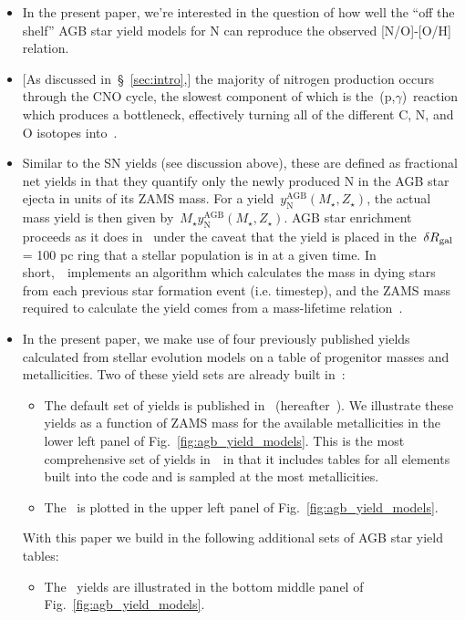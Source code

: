 \documentclass[ms.tex]{subfiles}
\begin{document}
\begin{itemize} 
	\item In the present paper, we're interested in the question of how 
	well the ``off the shelf'' AGB star yield models for N can reproduce the 
	observed [N/O]-[O/H] relation. 

	\item {[As discussed in~\S~\ref{sec:intro},]} the majority of nitrogen 
	production occurs through the CNO cycle, the slowest component of which is 
	the~\Nfourteen(p,$\gamma$)\Ofifteen~reaction which produces a bottleneck, 
	effectively turning all of the different C, N, and O isotopes 
	into~\Nfourteen. 

	\item Similar to the SN yields (see discussion above), these are defined as 
	fractional net yields in that they quantify only the newly produced N in 
	the AGB star ejecta in units of its ZAMS mass. 
	For a yield~$y_\text{N}^\text{AGB}(M_\star, Z_\star)$, the actual mass 
	yield is then given by~$M_\star y_\text{N}^\text{AGB}(M_\star, Z_\star)$. 
	AGB star enrichment proceeds as it does in~\citet{Johnson2020} under the 
	caveat that the yield is placed in the~$\delta R_\text{gal}$ = 100 pc ring that a 
	stellar population is in at a given time. 
	In short,~\vice~implements an algorithm which calculates the mass in dying 
	stars from each previous star formation event (i.e. timestep), and the ZAMS 
	mass required to calculate the yield comes from a mass-lifetime 
	relation~\citep*[e.g.][]{Hurley2000}. 

	\item In the present paper, we make use of four previously published yields 
	calculated from stellar evolution models on a table of progenitor masses 
	and metallicities. 
	Two of these yield sets are already built in~\vice: 
	\begin{itemize} 
		\item The default set of yields is published in~\citet{Cristallo2011, 
		Cristallo2015} (hereafter~\cristallo). 
		We illustrate these yields as a function of ZAMS mass for the available 
		metallicities in the lower left panel of 
		Fig.~\ref{fig:agb_yield_models}. 
		This is the most comprehensive set of yields in~\vice~in that it 
		includes tables for all elements built into the code and is sampled at 
		the most metallicities. 

		\item The~\citet[][hereafter~\karakasten]{Karakas2010} is plotted in 
		the upper left panel of Fig.~\ref{fig:agb_yield_models}. 
	\end{itemize} 
	With this paper we build in the following additional sets of AGB star yield 
	tables: 
	\begin{itemize} 
		\item The~\citet[][hereafter~\ventura]{Ventura2013} yields are 
		illustrated in the bottom middle panel of 
		Fig.~\ref{fig:agb_yield_models}. 


\end{itemize}
\end{itemize}
\end{document}
